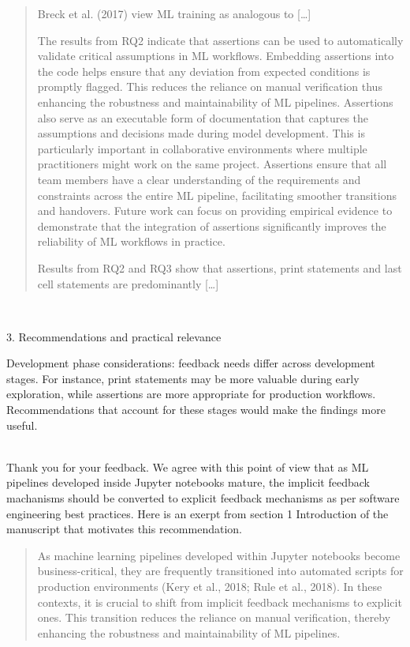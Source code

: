 \documentclass[11pt,fleqn]{article}
\newcommand{\eline}{\vspace*{.75\baselineskip}}
\newcommand{\Referee}[1]{\eline \noindent {\bf Reviewer comment #1:} \\}
\newcommand{\Us}{\eline \noindent {\bf Response:}\\}
\newenvironment{revcomment}[1][]
{\Referee{#1}\begin{rcomment}}
{\end{rcomment}}
\begin{document}
\begin{quote}
  Breck et al. (2017) view ML training as analogous to [\ldots]

  The results from RQ2 indicate that assertions can be used to automatically validate critical assumptions in ML workflows. Embedding assertions into the code helps ensure that any deviation from expected conditions is promptly flagged. This reduces the reliance on manual verification thus enhancing the robustness and maintainability of ML pipelines. Assertions also serve as an executable form of documentation that captures the assumptions and decisions made during model development. This is particularly important in collaborative environments where multiple practitioners might work on the same project. Assertions ensure that all team members have a clear understanding of the requirements and constraints across the entire ML pipeline, facilitating smoother transitions and handovers. Future work can focus on providing empirical evidence to demonstrate that the integration of assertions significantly improves the reliability of ML workflows in practice.

  Results from RQ2 and RQ3 show that assertions, print statements and last cell statements are predominantly [\ldots]
\end{quote}

\begin{revcomment}[2.10]
  3. Recommendations and practical relevance

  Development phase considerations: feedback needs differ across development stages. For instance, print statements may be more valuable during early exploration, while assertions are more appropriate for production workflows. Recommendations that account for these stages would make the findings more useful.
\end{revcomment}

\Us Thank you for your feedback. We agree with this point of view that as ML pipelines developed inside Jupyter notebooks mature, the implicit feedback machanisms should be converted to explicit feedback mechanisms as per software engineering best practices. Here is an exerpt from section 1 Introduction of the manuscript that motivates this recommendation.

\begin{quote}
  As machine learning pipelines developed within Jupyter notebooks become business-critical, they are frequently transitioned into automated scripts for production environments (Kery et al., 2018; Rule et al., 2018). In these contexts, it is crucial to shift from implicit feedback mechanisms to explicit ones. This transition reduces the reliance on manual verification, thereby enhancing the robustness and maintainability of ML pipelines.
\end{quote}
\end{document}
